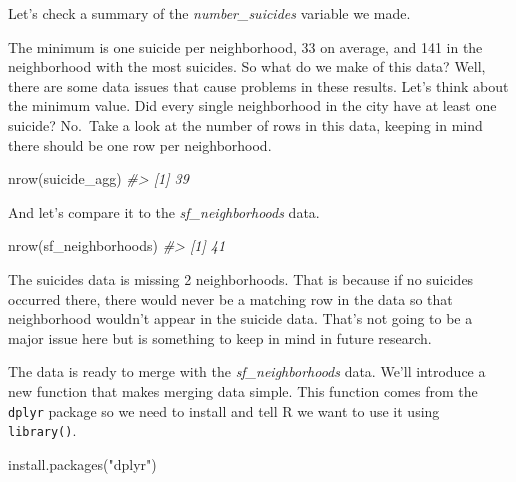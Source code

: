 \documentclass[
  12pt,
]{book}
\newenvironment{Shaded}{\begin{snugshade}}{\end{snugshade}}
\newcommand{\CommentTok}[1]{\textcolor[rgb]{0.37,0.37,0.37}{\textit{#1}}}
\newcommand{\FunctionTok}[1]{\textcolor[rgb]{0,0,0}{#1}}
\newcommand{\NormalTok}[1]{#1}
\newcommand{\SpecialCharTok}[1]{\textcolor[rgb]{0,0,0}{#1}}
\newcommand{\StringTok}[1]{\textcolor[rgb]{0.5,0.5,0.5}{#1}}
\begin{document}
Let's check a summary of the \emph{number\_suicides} variable we made.

\begin{Shaded}
\end{Shaded}

The minimum is one suicide per neighborhood, 33 on average, and 141 in the neighborhood with the most suicides. So what do we make of this data? Well, there are some data issues that cause problems in these results. Let's think about the minimum value. Did every single neighborhood in the city have at least one suicide? No.~Take a look at the number of rows in this data, keeping in mind there should be one row per neighborhood.

\begin{Shaded}
\begin{Highlighting}[]
\FunctionTok{nrow}\NormalTok{(suicide\_agg)}
\CommentTok{\#\textgreater{} [1] 39}
\end{Highlighting}
\end{Shaded}

And let's compare it to the \emph{sf\_neighborhoods} data.

\begin{Shaded}
\begin{Highlighting}[]
\FunctionTok{nrow}\NormalTok{(sf\_neighborhoods)}
\CommentTok{\#\textgreater{} [1] 41}
\end{Highlighting}
\end{Shaded}

The suicides data is missing 2 neighborhoods. That is because if no suicides occurred there, there would never be a matching row in the data so that neighborhood wouldn't appear in the suicide data. That's not going to be a major issue here but is something to keep in mind in future research.

The data is ready to merge with the \emph{sf\_neighborhoods} data. We'll introduce a new function that makes merging data simple. This function comes from the \texttt{dplyr} package so we need to install and tell R we want to use it using \texttt{library()}.

\begin{Shaded}
\begin{Highlighting}[]
\FunctionTok{install.packages}\NormalTok{(}\StringTok{"dplyr"}\NormalTok{)}
\end{Highlighting}
\end{Shaded}
\end{document}

